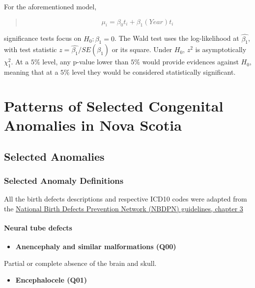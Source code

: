 \documentclass[
]{krantz}
\providecommand{\tightlist}{%
  \setlength{\itemsep}{0pt}\setlength{\parskip}{0pt}}
\begin{document}
For the aforementioned model,

\begin{quote}
\[
\mu_{i} = \beta_{0}t_{i} + \beta_{1}(Year)t_{i}
\]
\end{quote}

significance tests focus on \(H_{0}: \beta_{1} =0\). The Wald test uses the log-likelihood at \(\hat{\beta_{1}}\), with test statistic \(z=\hat{\beta_{1}} / SE(\hat{\beta_{1}})\) or its square. Under \(H_{0}\), \(z^{2}\) is asymptotically \(\chi^{2}_{1}\). At a \(5\%\) level, any p-value lower than \(5\%\) would provide evidences against \(H_{0}\), meaning that at a \(5\%\) level they would be considered statistically significant.

\hypertarget{chapter2}{%
\chapter{Patterns of Selected Congenital Anomalies in Nova Scotia}\label{chapter2}}

\hypertarget{section21}{%
\section{Selected Anomalies}\label{section21}}

\hypertarget{section211}{%
\subsection{Selected Anomaly Definitions}\label{section211}}

All the birth defects descriptions and respective ICD10 codes were adapted from the \href{https://www.nbdpn.org/docs/SGSC_-_Ch3_Case_Definition_-_final_draft_2016DEC20.pdf}{National Birth Defects Prevention Network (NBDPN) guidelines, chapter 3}

\hypertarget{section2111}{%
\subsubsection{Neural tube defects}\label{section2111}}

\begin{itemize}
\tightlist
\item
  \textbf{Anencephaly and similar malformations (Q00)}
\end{itemize}

Partial or complete absence of the brain and skull.

\begin{itemize}
\tightlist
\item
  \textbf{Encephalocele (Q01)}
\end{itemize}
\end{document}
